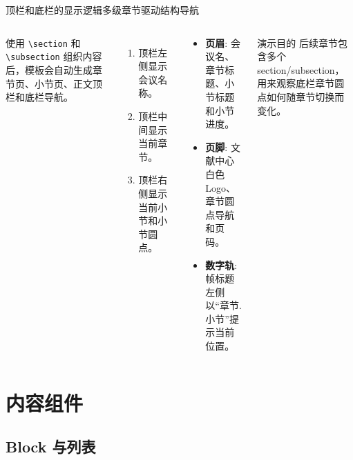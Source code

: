 \documentclass[aspectratio=169]{beamer}
\begin{document}
\begin{frame}{顶栏和底栏的显示逻辑}{多级章节驱动结构导航}
  \small
  \begin{columns}[T,onlytextwidth]
      \begin{nslrule}[结构输入]
        使用 \texttt{\textbackslash section} 和 \texttt{\textbackslash subsection} 组织内容后，模板会自动生成章节页、小节页、正文顶栏和底栏导航。
      \end{nslrule}

      \begin{enumerate}
        \item 顶栏左侧显示会议名称。
        \item 顶栏中间显示当前章节。
        \item 顶栏右侧显示当前小节和小节圆点。
      \end{enumerate}

      \begin{cookiecard}[title=本页可观察的导航元素]
        \begin{itemize}
          \item \textbf{页眉}: 会议名、章节标题、小节标题和小节进度。
          \item \textbf{页脚}: 文献中心白色 Logo、章节圆点导航和页码。
          \item \textbf{数字轨}: 帧标题左侧以“章节.小节”提示当前位置。
        \end{itemize}
      \end{cookiecard}
      \vspace{.25cm}
      \begin{exampleblock}{演示目的}
        后续章节包含多个 section/subsection，用来观察底栏章节圆点如何随章节切换而变化。
      \end{exampleblock}
  \end{columns}
\end{frame}

\section{内容组件}
\subsection{Block 与列表}
\end{document}
